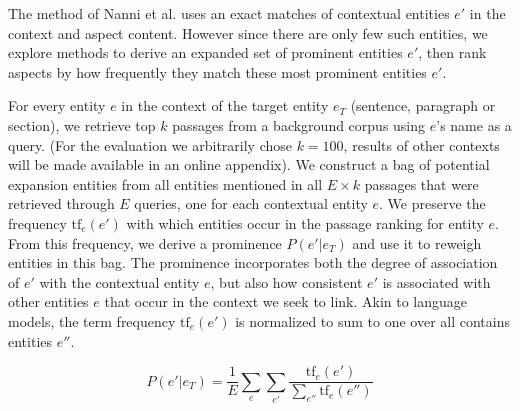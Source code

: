 
The method of Nanni et al. uses an exact matches of contextual entities $e'$ in the context and aspect content. However since there are only few such entities, we explore methods to derive an expanded set of prominent entities $e'$, then rank aspects by how frequently they match these most prominent entities $e'$. 

For every entity $e$ in the context of the target entity $e_T$ (sentence, paragraph or section), we retrieve top $k$ passages from a background corpus using $e$'s name as a query. (For the evaluation we arbitrarily chose $k=100$, results of other contexts will be made available in an online appendix). We construct a bag of potential expansion entities from all entities mentioned in all $E \times k$ passages that were retrieved through $E$ queries, one for each contextual entity $e$. We preserve the frequency $\text{tf}_{e}(e')$ with which entities occur in the passage ranking for entity $e$. 
%
From this frequency, we derive a prominence $P(e'|e_T)$ and use it to reweigh entities in this bag. The prominence incorporates both the degree of association of $e'$ with the contextual entity $e$, but also how consistent $e'$ is associated with other entities $e$ that occur in the context we seek to link. Akin to language models, the term frequency $\text{tf}_{e}(e')$ is normalized to sum to one over all contains entities $e''$.

    \begin{equation}
    \label{eq:prominence}
        P(e' \vert e_T) =  \frac{1}{E} \sum_e  \sum_{e'} \frac{\text{tf}_{e}(e')}{\sum_{e''}\text{tf}_{e}(e'')}
    \end{equation}



